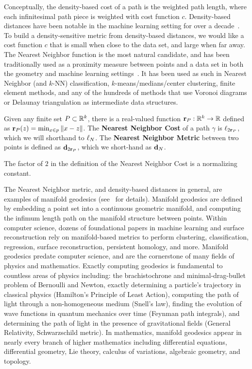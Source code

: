 Conceptually, the density-based cost of a path is the weighted path length,
where each infinitesimal path piece is weighted with cost function $c$.
Density-based distances have been notable in the machine learning setting
for over a decade~\cite{}. To build a density-sensitive metric from density-based
distances, we would like a cost function $c$ that is small when close to
the data set, and large when far away. The Nearest Neighbor function is the
most natural candidate, and has been traditionally used as a proximity
measure between points and a data set in both the geometry and machine
learning settings~\cite{}. It has been used as such in Nearest Neighbor
(and $k$-NN) classification, $k$-means/medians/center clustering, finite
element methods, and any of the hundreds of methods that use Voronoi
diagrams or Delaunay triangulation as intermediate data structures.

\begin{definition} Given any finite set $P\subset \mathbb{R}^k$, there is a
real-valued function $\mathbf{r}_P: \mathbb{R}^k\to \mathbb{R}$ defined as
$\mathbf{r}_P(z) = \min_{x\in p} \|x-z\|$.  The \textbf{Nearest Neighbor Cost}
of a path $\gamma$ is $\ell_{2 \mathbf{r}_P}$, which we will shorthand to
$\ell_N$.  
The \textbf{Nearest Neighbor Metric} between two points is
defined as $\mathbf{d}_{2 \mathbf{r}_P}$, which we short-hand as $\mathbf{d}_N$.

The factor of $2$ in the definition of the Nearest Neighbor Cost is a
normalizing constant.
\end{definition}
The Nearest Neighbor metric, and density-based distances in general, are
examples of manifold geodesics (see~\cite{} for details). Manifold
geodesics are defined by embedding a point set into a continuous geometric
manifold, and computing the infimum length path on the manifold structure
between points.  Within computer science, dozens of foundational papers in
machine learning and surface reconstruction rely on manifold-based metrics
to perform clustering, classification, regression, surface reconstruction,
persistent homology, and more.  Manifold geodesics
predate computer science, and are the cornerstone of many fields of
physics and mathematics. Exactly computing geodesics is fundamental
to countless areas of physics including: the brachistochrone and
minimal-drag-bullet problem of Bernoulli and Newton, exactly determining a
particle's trajectory in classical physics (Hamilton's Principle of Least
Action), computing the path of light through a non-homogeneous medium
(Snell's law), finding the evolution of wave functions in quantum mechanics
over time (Feynman path integrals), and determining the path of light in
the presence of gravitational fields (General Relativity, Schwarzschild
metric). In mathematics, manifold geodesics appear in nearly every branch
of higher mathematics including differential equations, differential
geometry, Lie theory, calculus of variations, algebraic geometry, and
topology.  

